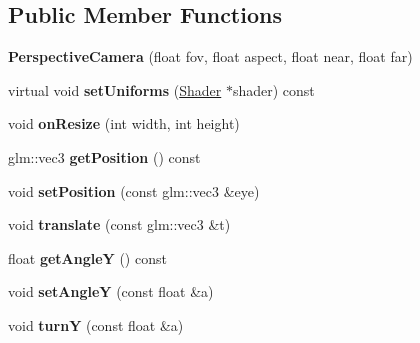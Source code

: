 \subsection*{Public Member Functions}
\begin{DoxyCompactItemize}
\item 
\hypertarget{class_perspective_camera_abd6326664a8e88335c5de79365a1ea15}{}{\bfseries Perspective\+Camera} (float fov, float aspect, float near, float far)\label{class_perspective_camera_abd6326664a8e88335c5de79365a1ea15}

\item 
\hypertarget{class_perspective_camera_ac54590aa7444d2bd2bf4b34b6ef45266}{}virtual void {\bfseries set\+Uniforms} (\hyperlink{class_shader}{Shader} $\ast$shader) const \label{class_perspective_camera_ac54590aa7444d2bd2bf4b34b6ef45266}

\item 
\hypertarget{class_perspective_camera_a5793e6291d90811a6743cac10ae6b0f1}{}void {\bfseries on\+Resize} (int width, int height)\label{class_perspective_camera_a5793e6291d90811a6743cac10ae6b0f1}

\item 
\hypertarget{class_perspective_camera_a36fa85a3f46042dbaf5819b7388b341a}{}glm\+::vec3 {\bfseries get\+Position} () const \label{class_perspective_camera_a36fa85a3f46042dbaf5819b7388b341a}

\item 
\hypertarget{class_perspective_camera_acfac6859cf992701454cb802ffb45796}{}void {\bfseries set\+Position} (const glm\+::vec3 \&eye)\label{class_perspective_camera_acfac6859cf992701454cb802ffb45796}

\item 
\hypertarget{class_perspective_camera_a66f7d8ec9370c792bee1a7c686e0e417}{}void {\bfseries translate} (const glm\+::vec3 \&t)\label{class_perspective_camera_a66f7d8ec9370c792bee1a7c686e0e417}

\item 
\hypertarget{class_perspective_camera_abb05342b409ac950b411e877af5e30f1}{}float {\bfseries get\+Angle\+Y} () const \label{class_perspective_camera_abb05342b409ac950b411e877af5e30f1}

\item 
\hypertarget{class_perspective_camera_a6c466eb6fb577bc67a1a27d40ec93fcf}{}void {\bfseries set\+Angle\+Y} (const float \&a)\label{class_perspective_camera_a6c466eb6fb577bc67a1a27d40ec93fcf}

\item 
\hypertarget{class_perspective_camera_ac3b176a18e12c0927350d3c833e43943}{}void {\bfseries turn\+Y} (const float \&a)\label{class_perspective_camera_ac3b176a18e12c0927350d3c833e43943}


\end{DoxyCompactItemize}
